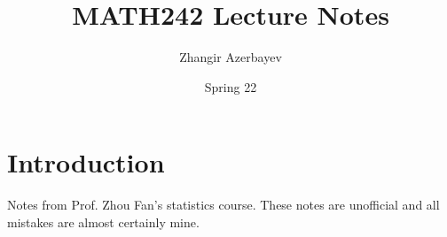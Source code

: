 \documentclass[oneside]{book}
\title{{\bf MATH242 Lecture Notes}}
\author{Zhangir Azerbayev}
\date{Spring 22}
\begin{document}
\maketitle
\frontmatter
\chapter{Introduction}
Notes from Prof. Zhou Fan's statistics course. These notes are unofficial and all mistakes are almost certainly mine. 
\tableofcontents
\mainmatter


\end{document}
